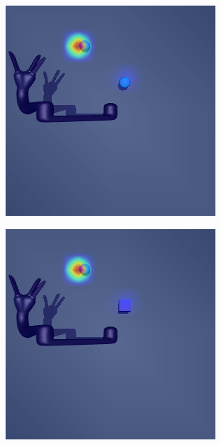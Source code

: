 \begin{figure}[h!]
  \begin{subfigure}{0.24\columnwidth}
    \includegraphics[width=\linewidth]{figures/chapter6/distractor_saliency_jaco_pro_on/color_sensor_std}
  \end{subfigure}
  \begin{subfigure}{0.24\columnwidth}
    \includegraphics[width=\linewidth]{figures/chapter6/distractor_saliency_jaco_pro_on/shape_sensor_std}
  \end{subfigure}
  

\end{figure}

